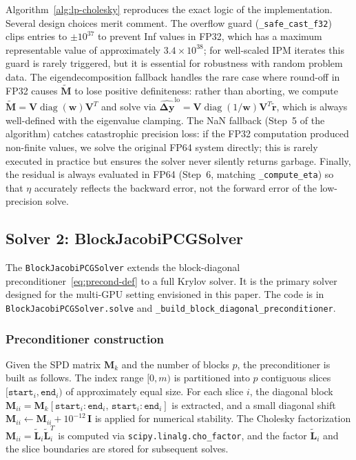 \documentclass[11pt,twoside]{article}
\newcommand{\by}{\mathbf{y}}
\newcommand{\bL}{\mathbf{L}}
\newcommand{\bM}{\mathbf{M}}
\newcommand{\bV}{\mathbf{V}}
\newcommand{\br}{\mathbf{r}}
\newcommand{\bw}{\mathbf{w}}
\newcommand{\bDelta}{\mathbf{\Delta}}
\newcommand{\diag}{\operatorname{diag}}
\begin{document}
Algorithm~\ref{alg:lp-cholesky} reproduces the exact logic of the
implementation.  Several design choices merit comment.  The overflow guard
(\texttt{\_safe\_cast\_f32}) clips entries to $\pm 10^{37}$ to prevent Inf
values in FP32, which has a maximum representable value of approximately
$3.4 \times 10^{38}$; for well-scaled IPM iterates this guard is rarely
triggered, but it is essential for robustness with random problem data.
The eigendecomposition fallback handles the rare case where round-off in
FP32 causes $\widetilde{\bM}$ to lose positive definiteness: rather than
aborting, we compute $\widetilde{\bM} = \bV\diag(\bw)\bV^T$ and solve via
$\widehat{\bDelta\by}^{\text{lo}} = \bV\diag(1/\bw)\bV^T \widetilde{\br}$,
which is always well-defined with the eigenvalue clamping.  The NaN
fallback (Step~5 of the algorithm) catches catastrophic precision loss: if
the FP32 computation produced non-finite values, we solve the original FP64
system directly; this is rarely executed in practice but ensures the solver
never silently returns garbage.  Finally, the residual is always evaluated
in FP64 (Step~6, matching \texttt{\_compute\_eta}) so that $\eta$
accurately reflects the backward error, not the forward error of the
low-precision solve.

\subsection{Solver 2: BlockJacobiPCGSolver}
\label{sec:bj-pcg}

The \texttt{BlockJacobiPCGSolver} extends the block-diagonal
preconditioner~\eqref{eq:precond-def} to a full Krylov solver.  It is the
primary solver designed for the multi-GPU setting envisioned in this
paper.  The code is in \texttt{BlockJacobiPCGSolver.solve} and
\texttt{\_build\_block\_diagonal\_preconditioner}.

\subsubsection{Preconditioner construction}

Given the SPD matrix $\bM_k$ and the number of blocks $p$, the
preconditioner is built as follows.  The index range $[0, m)$ is partitioned
into $p$ contiguous slices $[\texttt{start}_i, \texttt{end}_i)$ of
approximately equal size.  For each slice $i$, the diagonal block
$\bM_{ii} = \bM_k[\texttt{start}_i{:}\texttt{end}_i,\,
\texttt{start}_i{:}\texttt{end}_i]$ is extracted, and a small diagonal shift
$\bM_{ii} \gets \bM_{ii} + 10^{-12}\, \mathbf{I}$ is applied for numerical
stability.  The Cholesky factorization $\bM_{ii} =
\widetilde{\bL}_i\widetilde{\bL}_i^T$ is computed via
\texttt{scipy.linalg.cho\_factor}, and the factor $\widetilde{\bL}_i$ and
the slice boundaries are stored for subsequent solves.
\end{document}
